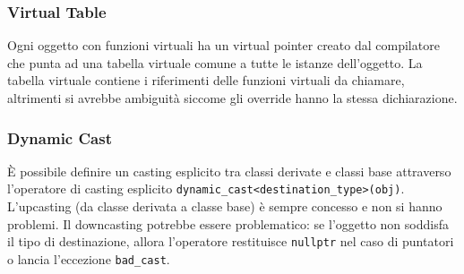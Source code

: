 \documentclass[a4paper]{article}
\begin{document}
\subsubsection*{Virtual Table}
Ogni oggetto con funzioni virtuali ha un virtual pointer creato dal compilatore che punta ad una tabella virtuale comune a tutte
le istanze dell'oggetto. La tabella virtuale contiene i riferimenti delle funzioni virtuali da chiamare, altrimenti si avrebbe
ambiguità siccome gli override hanno la stessa dichiarazione.

\subsubsection*{Dynamic Cast}
È possibile definire un casting esplicito tra classi derivate e classi base attraverso l'operatore di casting esplicito
\verb|dynamic_cast<destination_type>(obj)|. L'upcasting (da classe derivata a classe base) è sempre concesso e non si hanno
problemi. Il downcasting potrebbe essere problematico: se l'oggetto non soddisfa il tipo di destinazione, allora l'operatore
restituisce \verb|nullptr| nel caso di puntatori o lancia l'eccezione \verb|bad_cast|.

\newpage
\end{document}
